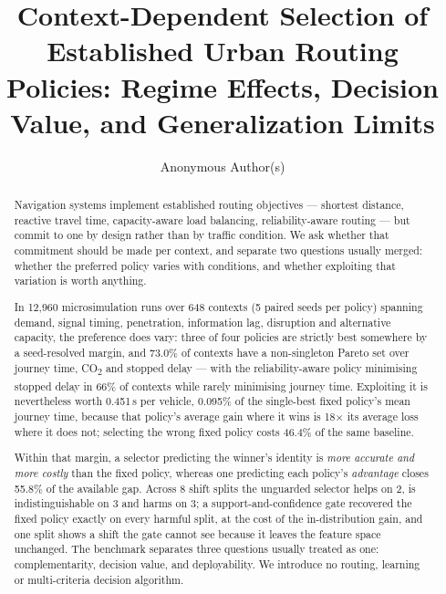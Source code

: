 \documentclass[runningheads]{llncs}
\newcommand{\CO}{CO\textsubscript{2}}
\begin{document}
\title{Context-Dependent Selection of Established Urban Routing Policies:
Regime Effects, Decision Value, and Generalization Limits}
\author{Anonymous Author(s)}
\maketitle

\begin{abstract}
Navigation systems implement established routing objectives --- shortest
distance, reactive travel time, capacity-aware load balancing,
reliability-aware routing --- but commit to one by design rather than by traffic
condition. We ask whether that commitment should be made per context, and
separate two questions usually merged: whether the preferred policy varies with
conditions, and whether exploiting that variation is worth anything.

In 12{,}960 microsimulation runs over 648 contexts
(5 paired seeds per policy) spanning demand, signal timing,
penetration, information lag, disruption and alternative capacity, the
preference does vary: three of four policies are strictly best somewhere by a
seed-resolved margin, and 73.0\% of contexts have a
non-singleton Pareto set over journey time, \CO{} and stopped delay --- with the
reliability-aware policy minimising stopped delay in 66\% of
contexts while rarely minimising journey time. Exploiting it is nevertheless
worth 0.451\,s per vehicle, 0.095\% of the single-best fixed
policy's mean journey time, because that policy's average gain where it wins is
18$\times$ its average loss where it does not; selecting the wrong
fixed policy costs 46.4\% of the same baseline.

Within that margin, a selector predicting the winner's identity is \emph{more
accurate and more costly} than the fixed policy, whereas one predicting each
policy's \emph{advantage} closes 55.8\% of the available gap.
Across 8 shift splits the unguarded selector helps on
2, is indistinguishable on 3 and harms on
3; a support-and-confidence gate recovered the fixed policy
exactly on every harmful split, at the cost of the in-distribution gain, and one
split shows a shift the gate cannot see because it leaves the feature space
unchanged. The benchmark separates three questions usually treated as one:
complementarity, decision value, and deployability. We introduce no routing,
learning or multi-criteria decision algorithm.

\end{abstract}
\end{document}
